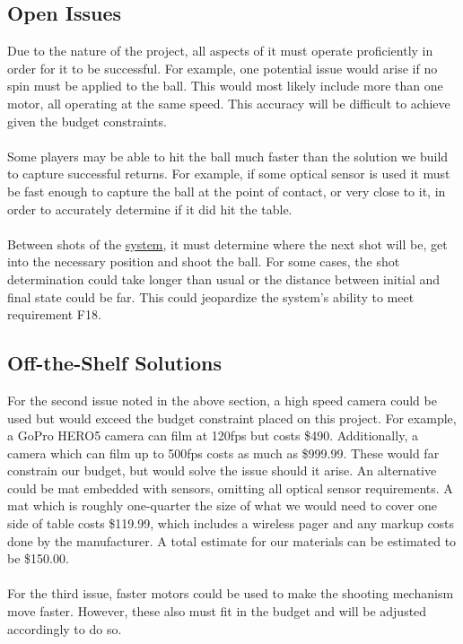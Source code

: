 \documentclass[11pt]{article}
\begin{document}
\subsection{Open Issues}
Due to the nature of the project, all aspects of it must operate proficiently in order for it to be successful. For example, one potential issue would arise if no spin must be applied to the ball. This would most likely include more than one motor, all operating at the same speed. This accuracy will be difficult to achieve given the budget constraints. \\\\
Some players may be able to hit the ball much faster than the solution we build to capture successful returns. For example, if some optical sensor is used it must be fast enough to capture the ball at the point of contact, or very close to it, in order to accurately determine if it did hit the table. \\\\
Between shots of the \hyperref[sec:definitions]{system}, it must determine where the next shot will be, get into the necessary position and shoot the ball. For some cases, the shot determination could take longer than usual or the distance between initial and final state could be far. This could jeopardize the system's ability to meet requirement F18.
\subsection{Off-the-Shelf Solutions}
For the second issue noted in the above section, a high speed camera could be used but would exceed the budget constraint placed on this project. For example, a GoPro HERO5 camera can film at 120fps but costs \$490.%
Additionally, a camera which can film up to 500fps costs as much as \$999.99.%
These would far constrain our budget, but would solve the issue should it arise. An alternative could be mat embedded with sensors, omitting all optical sensor requirements. A mat which is roughly one-quarter the size of what we would need to cover one side of table costs \$119.99, which includes a wireless pager and any markup costs done by the manufacturer. A total estimate for our materials can be estimated to be \$150.00.\\\\
For the third issue, faster motors could be used to make the shooting mechanism move faster. However, these also must fit in the budget and will be adjusted accordingly to do so.
\end{document}
